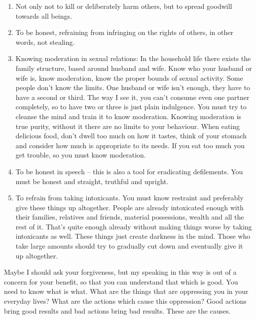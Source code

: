 \begin{enumerate}
\item Not only not to kill or deliberately harm others, but to spread goodwill towards all beings.

\item To be honest, refraining from infringing on the rights of others, in other words, not stealing.

\item Knowing moderation in sexual relations: In the household life there exists the family structure, based around husband and wife. Know who your husband or wife is, know moderation, know the proper bounds of sexual activity. Some people don't know the limits. One husband or wife isn't enough, they have to have a second or third. The way I see it, you can't consume even one partner completely, so to have two or three is just plain indulgence. You must try to cleanse the mind and train it to know moderation. Knowing moderation is true purity, without it there are no limits to your behaviour. When eating delicious food, don't dwell too much on how it tastes, think of your stomach and consider how much is appropriate to its needs. If you eat too much you get trouble, so you must know moderation.

\item To be honest in speech -- this is also a tool for eradicating defilements. You must be honest and straight, truthful and upright.

\item To refrain from taking intoxicants. You must know restraint and preferably give these things up altogether. People are already intoxicated enough with their families, relatives and friends, material possessions, wealth and all the rest of it. That's quite enough already without making things worse by taking intoxicants as well. These things just create darkness in the mind. Those who take large amounts should try to gradually cut down and eventually give it up altogether.
\end{enumerate}

Maybe I should ask your forgiveness, but my speaking in this way is out of a concern for your benefit, so that you can understand that which is good. You need to know what is what. What are the things that are oppressing you in your everyday lives? What are the actions which cause this oppression? Good actions bring good results and bad actions bring bad results. These are the causes.

